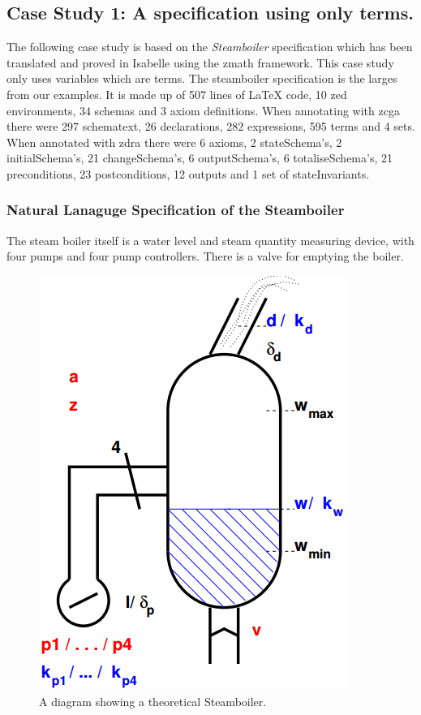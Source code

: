 \subsection{Case Study 1: A specification using only terms.}
\label{subsec:casestudy1}

The following case study is based on the \emph{Steamboiler}
\cite{steamboilerslides} specification which has been translated and proved in
Isabelle using the \gls{zmath} framework. This case study only uses variables
which are terms. The steamboiler specification is the larges from our examples.
It is made up of 507 lines of \LaTeX{} code, 10 zed environments, 34 schemas and
3 axiom definitions. When annotating with \gls{zcga} there were 297 schematext,
26 declarations, 282 expressions, 595 terms and 4 sets. When annotated with
\gls{zdra} there were 6 axioms, 2 stateSchema's, 2 initialSchema's, 21
changeSchema's, 6 outputSchema's, 6 totaliseSchema's, 21 preconditions, 23
postconditions, 12 outputs and 1 set of stateInvariants.

\subsubsection{Natural Lanaguge Specification of the Steamboiler}

The steam boiler itself is a water level and steam quantity measuring device,
with four pumps and four pump controllers. There is a valve for emptying the
boiler.

\begin{figure}[H]
\centering
\includegraphics[scale=0.5]{Figures/Evaluation/steamboilerimage.png}
\caption{A diagram showing a theoretical Steamboiler. \label{fig:steamboiler}}
\end{figure}

